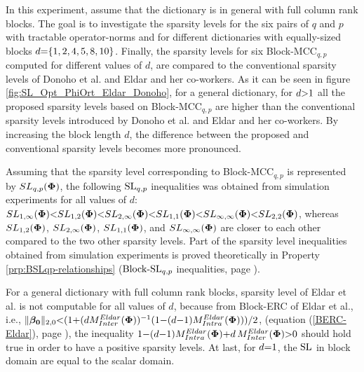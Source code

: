 In this experiment, assume that the dictionary is in general with full column rank blocks.
The goal is to investigate the sparsity levels for the six pairs of $q$ and $p$ with tractable operator-norms and for different dictionaries with equally-sized blocks $d {=} \{ 1,2,4,5,8,10 \}$.
Finally, the sparsity levels for six Block-MCC$_{q,p}$ computed for different values of $d$, are compared to the conventional sparsity levels of Donoho et al. and Eldar and her co-workers.
As it can be seen in figure \ref{fig:SL_Opt_PhiOrt_Eldar_Donoho}, for a general dictionary, for $d {>} 1$ all the proposed sparsity levels based on Block-MCC$_{q,p}$ are higher than the conventional sparsity levels introduced by Donoho et al. and Eldar and her co-workers.
By increasing the block length $d$, the difference between the proposed and conventional sparsity levels becomes more pronounced.     

Assuming that the sparsity level corresponding to Block-MCC$_{q,p}$ is represented by $SL_{q,p}(\boldsymbol{\Phi})$, the following $\mathrm{SL}_{q,p}$ inequalities was obtained from simulation experiments for all values of $d$: 
$SL_{1,\infty}(\boldsymbol{\Phi}) {<} SL_{1,2}(\boldsymbol{\Phi}) {<} SL_{2,\infty}(\boldsymbol{\Phi}) {<} SL_{1,1}(\boldsymbol{\Phi}) {<} SL_{\infty,\infty}(\boldsymbol{\Phi}) {<} SL_{2,2}(\boldsymbol{\Phi})$, whereas $SL_{1,2}(\boldsymbol{\Phi})$, $SL_{2,\infty}(\boldsymbol{\Phi})$, $SL_{1,1}(\boldsymbol{\Phi})$, and $SL_{\infty,\infty}(\boldsymbol{\Phi})$ are closer to each other compared to the two other sparsity levels. 
Part of the sparsity level inequalities obtained from simulation experiments is proved theoretically in Property \ref{prp:BSLqp-relationships} ($\mathrm{Block\text{{-}}SL}_{q,p}$ inequalities, page \pageref{prp:BSLqp-relationships}).

For a general dictionary with full column rank blocks, sparsity level of Eldar et al. is not computable for all values of $d$, because from Block-ERC of Eldar et al., i.e., $\Vert \boldsymbol{\beta_0} \Vert_{2,0} {<} (1 {+} (d M^{Eldar}_{Inter}(\boldsymbol{\Phi}))^{-1} (1 {-} (d {-} 1)M^{Eldar}_{Intra}(\boldsymbol{\Phi})))/2$, (equation (\ref{BERC-Eldar}), page \pageref{BERC-Eldar}), the inequality $1 {-} (d {-} 1) M^{Eldar}_{Intra}(\boldsymbol{\Phi}) {+} d \, M^{Eldar}_{Inter}(\boldsymbol{\Phi}) {>} 0$ should hold true in order to have a positive sparsity levels.
At last, for $d {=} 1$, the $\mathrm{SL}$ in block domain are equal to the scalar domain.

\FloatBarrier